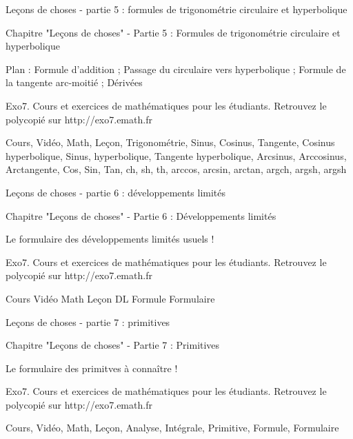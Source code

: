 Leçons de choses - partie 5 : formules de trigonométrie circulaire et hyperbolique



Chapitre "Leçons de choses" - Partie 5 : Formules de trigonométrie circulaire et hyperbolique

Plan : Formule d'addition ; Passage du circulaire vers hyperbolique ; Formule de la tangente arc-moitié ; Dérivées

Exo7. Cours et exercices de mathématiques pour les étudiants.
Retrouvez le polycopié sur http://exo7.emath.fr


Cours, Vidéo, Math, Leçon, Trigonométrie, Sinus, Cosinus, Tangente, Cosinus hyperbolique, 
Sinus, hyperbolique, Tangente hyperbolique, Arcsinus, Arccosinus, Arctangente, Cos, Sin, Tan, ch, sh, th, arccos, arcsin, arctan,
argch, argsh, argsh




Leçons de choses - partie 6 : développements limités

 
Chapitre "Leçons de choses" - Partie 6 : Développements limités

Le formulaire des développements limités usuels !

Exo7. Cours et exercices de mathématiques pour les étudiants.
Retrouvez le polycopié sur http://exo7.emath.fr


Cours Vidéo Math Leçon DL Formule Formulaire




Leçons de choses - partie 7 : primitives

 
Chapitre "Leçons de choses" - Partie 7 : Primitives

Le formulaire des primitves à connaître !

Exo7. Cours et exercices de mathématiques pour les étudiants.
Retrouvez le polycopié sur http://exo7.emath.fr


Cours, Vidéo, Math, Leçon, Analyse, Intégrale, Primitive, Formule, Formulaire
